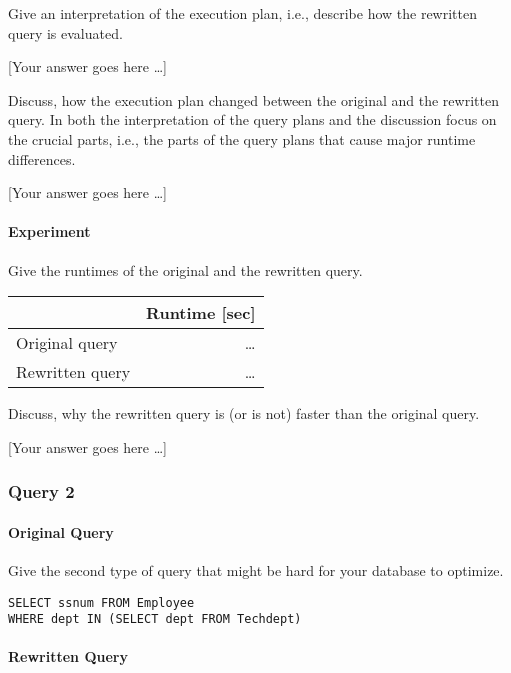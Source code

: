 \documentclass[11pt]{scrartcl}
\newcommand{\youranswerhere}{[Your answer goes here \ldots]}
\begin{document}
    Give an interpretation of the execution plan, i.e., describe how the rewritten query is evaluated.

    \youranswerhere{}

    Discuss, how the execution plan changed between the original and the rewritten query. In both the interpretation of the query plans and the discussion focus on the crucial parts, i.e., the parts of the query plans that cause major runtime differences.

    \youranswerhere{}

    \paragraph{Experiment}

    Give the runtimes of the original and the rewritten query.

    \begin{table}[H]
        \centering
        \begin{tabular}{l|r}
            & Runtime [sec] \tabularnewline
            \hline
            Original query & \ldots \tabularnewline
            Rewritten query & \ldots \tabularnewline
        \end{tabular}
    \end{table}

    Discuss, why the rewritten query is (or is not) faster than the original query.

    \youranswerhere{}

    \subsubsection*{Query 2}

    \paragraph{Original Query}

    Give the second type of query that might be hard for your database to optimize.

    \begin{lstlisting}[style=dbtsql]
SELECT ssnum FROM Employee
WHERE dept IN (SELECT dept FROM Techdept)
    \end{lstlisting}

    \paragraph{Rewritten Query}
\end{document}
